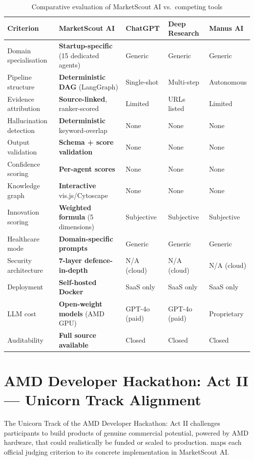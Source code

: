 \documentclass[12pt,a4paper,oneside]{book}
\begin{document}
\begin{table}[H]
\centering
\caption{Comparative evaluation of MarketScout AI vs.\ competing tools}
\label{tab:comparison}
\begin{tabularx}{\textwidth}{lXXXX}
\toprule
\textbf{Criterion} & \textbf{MarketScout AI} & \textbf{ChatGPT} & \textbf{Deep Research} & \textbf{Manus AI} \\
\midrule
Domain specialisation & \textbf{Startup-specific} (15 dedicated agents) & Generic & Generic & Generic \\
Pipeline structure & \textbf{Deterministic DAG} (LangGraph) & Single-shot & Multi-step & Autonomous \\
Evidence attribution & \textbf{Source-linked}, ranker-scored & Limited & URLs listed & Limited \\
Hallucination detection & \textbf{Deterministic} keyword-overlap & None & None & None \\
Output validation & \textbf{Schema + score validation} & None & None & None \\
Confidence scoring & \textbf{Per-agent scores} & None & None & None \\
Knowledge graph & \textbf{Interactive} vis.js/Cytoscape & None & None & None \\
Innovation scoring & \textbf{Weighted formula} (5 dimensions) & Subjective & Subjective & Subjective \\
Healthcare mode & \textbf{Domain-specific prompts} & Generic & Generic & Generic \\
Security architecture & \textbf{7-layer defence-in-depth} & N/A (cloud) & N/A (cloud) & N/A (cloud) \\
Deployment & \textbf{Self-hosted Docker} & SaaS only & SaaS only & SaaS only \\
LLM cost & \textbf{Open-weight models} (AMD GPU) & GPT-4o (paid) & GPT-4o (paid) & Proprietary \\
Auditability & \textbf{Full source available} & Closed & Closed & Closed \\
\bottomrule
\end{tabularx}
\end{table}

\section{AMD Developer Hackathon: Act II — Unicorn Track Alignment}

The Unicorn Track of the AMD Developer Hackathon: Act II challenges participants to build
products of genuine commercial potential, powered by AMD hardware, that could realistically
be funded or scaled to production.  maps each official judging criterion
to its concrete implementation in MarketScout AI.
\end{document}
